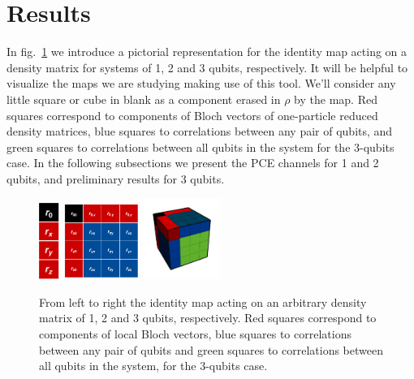 \documentclass[11pt,dvipsnames]{article} %
\newcommand{\fref}[1]{fig.~\ref{#1}}  \newcommand{\tref}[1]{table~\ref{#1}}
\newcommand{\1}{\mathds{1}}
\begin{document}
\section*{Results} %
In \fref{fig:pictorial-rep-rho} we introduce a pictorial representation 
for the identity map acting on a density matrix for systems 
of 1, 2 and 3 qubits,
respectively. It will be helpful to visualize the maps we are studying 
making use of this tool. We'll consider any little square or cube in blank
as a component erased in $\rho$ by the map. 
Red squares correspond to components of Bloch vectors of one-particle reduced density matrices,
blue squares to correlations between any pair of qubits, and
green squares to correlations between all qubits in the system for
the 3-qubits case.
In the following subsections we present the PCE channels for
1 and 2 qubits, and preliminary results for 3 qubits.
\begin{figure}[H] %
	\centering
	\hfill \hfill
	\includegraphics[height=2.5cm]
	{img/tablero-1q}
	\hfill
	\includegraphics[width=2.5cm]
	{img/rho2q(2)}
	\hfill 
	\includegraphics[width=2.5cm]
	{img/rho-3q}
	\hfill \hfill
	\caption{From left to right the identity map acting on
  an arbitrary density matrix of 1, 2 and 3 qubits, respectively. 
	Red squares correspond to components of local Bloch vectors,
	blue squares to correlations between any pair of qubits and
	green squares to correlations between all qubits in the system, for
	the 3-qubits case. }
	\label{fig:pictorial-rep-rho}
\end{figure} %
\end{document}
